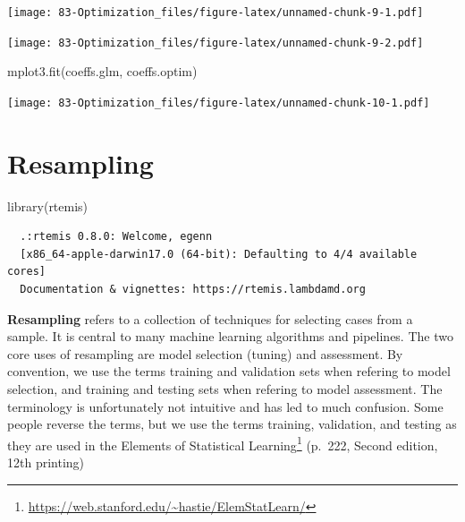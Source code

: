 \documentclass[
]{book}
\newenvironment{Shaded}{\begin{snugshade}}{\end{snugshade}}
\newcommand{\DecValTok}[1]{\textcolor[rgb]{0.00,0.00,0.81}{#1}}
\newcommand{\FunctionTok}[1]{\textcolor[rgb]{0.00,0.00,0.00}{#1}}
\newcommand{\NormalTok}[1]{#1}
\newcommand{\OtherTok}[1]{\textcolor[rgb]{0.56,0.35,0.01}{#1}}
\newcommand{\SpecialCharTok}[1]{\textcolor[rgb]{0.00,0.00,0.00}{#1}}
\renewcommand{\href}[2]{#2\footnote{\url{#1}}}
\begin{document}
\texttt{[image: 83-Optimization\_files/figure-latex/unnamed-chunk-9-1.pdf]}

\begin{Shaded}
\end{Shaded}

\texttt{[image: 83-Optimization\_files/figure-latex/unnamed-chunk-9-2.pdf]}

\begin{Shaded}
\begin{Highlighting}[]
\FunctionTok{mplot3.fit}\NormalTok{(coeffs.glm, coeffs.optim)}
\end{Highlighting}
\end{Shaded}

\texttt{[image: 83-Optimization\_files/figure-latex/unnamed-chunk-10-1.pdf]}

\hypertarget{resampling}{%
\chapter{Resampling}\label{resampling}}

\begin{Shaded}
\begin{Highlighting}[]
\FunctionTok{library}\NormalTok{(rtemis)}
\end{Highlighting}
\end{Shaded}

\begin{verbatim}
  .:rtemis 0.8.0: Welcome, egenn
  [x86_64-apple-darwin17.0 (64-bit): Defaulting to 4/4 available cores]
  Documentation & vignettes: https://rtemis.lambdamd.org
\end{verbatim}

\textbf{Resampling} refers to a collection of techniques for selecting cases from a sample. It is central to many machine learning algorithms and pipelines. The two core uses of resampling are model selection (tuning) and assessment. By convention, we use the terms training and validation sets when refering to model selection, and training and testing sets when refering to model assessment. The terminology is unfortunately not intuitive and has led to much confusion. Some people reverse the terms, but we use the terms training, validation, and testing as they are used in the \href{https://web.stanford.edu/~hastie/ElemStatLearn/}{Elements of Statistical Learning} (p.~222, Second edition, 12th printing)
\end{document}
